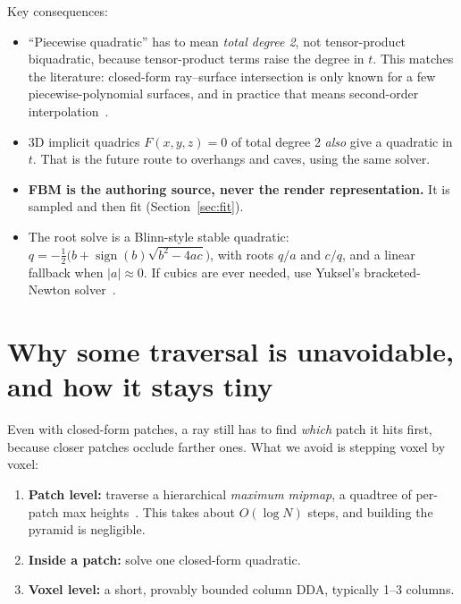 \documentclass[11pt]{article}
\begin{document}
Key consequences:
\begin{itemize}
\item ``Piecewise quadratic'' has to mean \emph{total degree 2}, not tensor-product biquadratic, because tensor-product terms raise the degree in $t$. This matches the literature: closed-form ray--surface intersection is only known for a few piecewise-polynomial surfaces, and in practice that means second-order interpolation~\cite{rbf}.
\item 3D implicit quadrics $F(x,y,z)=0$ of total degree 2 \emph{also} give a quadratic in $t$. That is the future route to overhangs and caves, using the same solver.
\item \textbf{FBM is the authoring source, never the render representation.} It is sampled and then fit (Section~\ref{sec:fit}).
\item The root solve is a Blinn-style stable quadratic: $q=-\tfrac12\bigl(b+\operatorname{sign}(b)\sqrt{b^2-4ac}\bigr)$, with roots $q/a$ and $c/q$, and a linear fallback when $|a|\approx 0$. If cubics are ever needed, use Yuksel's bracketed-Newton solver~\cite{yuksel}.
\end{itemize}

\section{Why some traversal is unavoidable, and how it stays tiny}
Even with closed-form patches, a ray still has to find \emph{which} patch it hits first, because closer patches occlude farther ones. What we avoid is stepping voxel by voxel:
\begin{enumerate}
\item \textbf{Patch level:} traverse a hierarchical \emph{maximum mipmap}, a quadtree of per-patch max heights~\cite{tevs,ebert}. This takes about $O(\log N)$ steps, and building the pyramid is negligible.
\item \textbf{Inside a patch:} solve one closed-form quadratic.
\item \textbf{Voxel level:} a short, provably bounded column DDA, typically 1--3 columns.
\end{enumerate}
\end{document}

